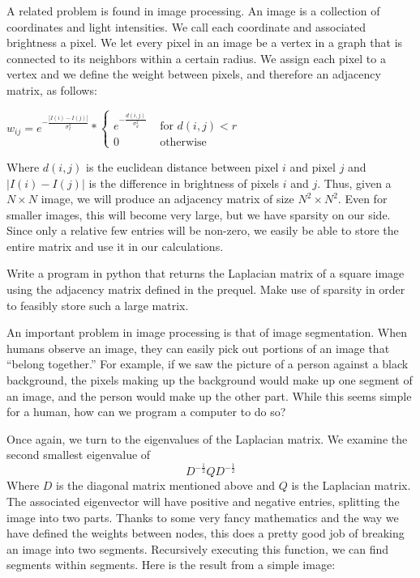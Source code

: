 A related problem is found in image processing.  An image is a collection of coordinates and light intensities.  We call each coordinate and associated brightness a pixel. We let every pixel in an image be a vertex in a graph that is connected to its neighbors within a certain radius.  We assign each pixel to a vertex and we define the weight between pixels, and therefore an adjacency matrix, as follows:

\begin{center}
$w_{ij} = e^{-\frac{|I(i) - I(j)|}{\sigma_I^2}} * \begin{cases} e^{-\frac{d(i,j)}{\sigma_d^2}} & \mbox{ for $d(i,j) < r$} \\ 0 & \mbox{ otherwise} \end{cases}$
\end{center}

Where $d(i,j)$ is the euclidean distance between pixel $i$ and pixel $j$ and $|I(i) - I(j)|$ is the difference in brightness of pixels $i$ and $j$.  Thus, given a $N\times N$ image, we will produce an adjacency matrix of size $N^2\times N^2$.  Even for smaller images, this will become very large, but we have sparsity on our side.  Since only a relative few entries will be non-zero, we easily be able to store the entire matrix and use it in our calculations.

\begin{problem}  Write a program in python that returns the Laplacian matrix of a square image using the adjacency matrix defined in the prequel.  Make use of sparsity in order to feasibly store such a large matrix.
\end{problem}

An important problem in image processing is that of image segmentation.  When humans observe an image, they can easily pick out portions of an image that ``belong together.''  For example, if we saw the picture of a person against a black background, the pixels making up the background would make up one segment of an image, and the person would make up the other part.  While this seems simple for a human, how can we program a computer to do so?

Once again, we turn to the eigenvalues of the Laplacian matrix.  We examine the second smallest eigenvalue of
\[
D^{-\frac{1}{2}}QD^{-\frac{1}{2}}
\]
Where $D$ is the diagonal matrix mentioned above and $Q$ is the Laplacian matrix.  The associated eigenvector will have positive and negative entries, splitting the image into two parts.  Thanks to some very fancy mathematics and the way we have defined the weights between nodes, this does a pretty good job of breaking an image into two segments.  Recursively executing this function, we can find segments within segments.  Here is the result from a simple image:


